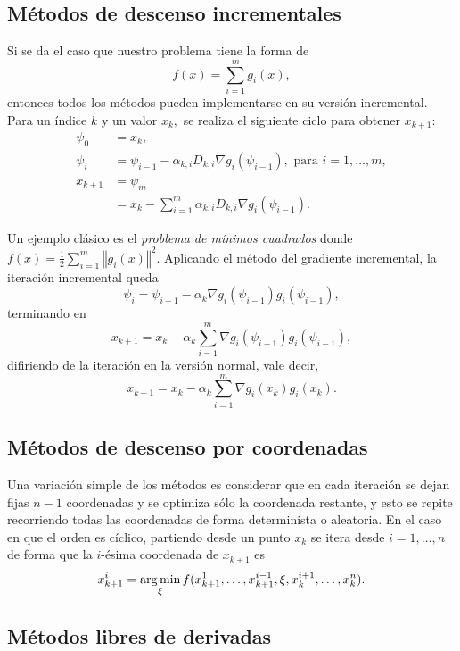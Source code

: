 \subsection{Métodos de descenso incrementales}

Si se da el caso que nuestro problema tiene la forma de
\[f(x) = \sum_{i=1}^m g_i(x),\]
entonces todos los métodos pueden implementarse en su versión incremental. Para un índice \(k\) y un valor \(x_k,\) se realiza el siguiente ciclo para obtener \(x_{k+1}\):
\begin{align*}
\psi_0	&= x_k,\\
\psi_i	&= \psi_{i-1} - \alpha_{k, i} D_{k, i} \nabla g_i(\psi_{i-1}), \text{ para } i=1, \dotsc, m,\\
x_{k+1}	&= \psi_m\\
&= x_k - \sum_{i=1}^m \alpha_{k, i} D_{k, i} \nabla g_i(\psi_{i-1}).
\end{align*}

Un ejemplo clásico es el \emph{problema de mínimos cuadrados} donde \(f(x)=\frac{1}{2}\sum\limits_{i=1}^{m}\left\Vert g_{i}(x)\right\Vert ^{2}\). Aplicando el método del gradiente incremental, la iteración incremental queda
\[\psi_i = \psi_{i-1} - \alpha_k \nabla g_i(\psi_{i-1}) g_i(\psi_{i-1}),\]
terminando en
\[x_{k+1} = x_k - \alpha_k \sum_{i=1}^m \nabla g_i(\psi_{i-1}) g_i(\psi_{i-1}),\]
difiriendo de la iteración en la versión normal, vale decir,
\[x_{k+1} = x_k - \alpha_k \sum_{i=1}^m \nabla g_i(x_k) g_i(x_k).\]

\subsection{Métodos de descenso por coordenadas}

Una variación simple de los métodos es considerar que en cada iteración se dejan fijas \(n-1\) coordenadas y se optimiza sólo la coordenada restante, y esto se repite recorriendo todas las coordenadas de forma determinista o aleatoria. En el caso en que el orden es cíclico, partiendo desde un punto \(x_k\) se itera desde \(i = 1, \dotsc, n\) de forma que la \(i\)-ésima coordenada de \(x_{k+1}\) es
\begin{equation*}
x_{k+1}^i = \operatorname*{\arg\min}_{\xi} f(x_{k+1}^1, \dotsc, x_{k+1}^{i-1}, \xi, x_k^{i+1}, \dotsc, x_k^n).
\end{equation*}

\subsection{Métodos libres de derivadas}

